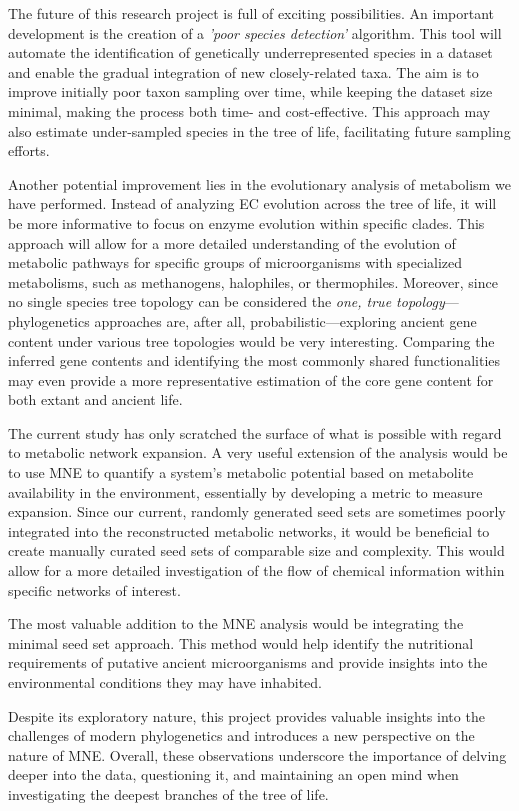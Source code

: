 The future of this research project is full of exciting possibilities. An important development is the creation of a \textit{'poor species detection'} algorithm. This tool will automate the identification of genetically underrepresented species in a dataset and enable the gradual integration of new closely-related taxa. The aim is to improve initially poor taxon sampling over time, while keeping the dataset size minimal, making the process both time- and cost-effective. This approach may also estimate under-sampled species in the tree of life, facilitating future sampling efforts.

Another potential improvement lies in the evolutionary analysis of metabolism we have performed. Instead of analyzing EC evolution across the tree of life, it will be more informative to focus on enzyme evolution within specific clades. This approach will allow for a more detailed understanding of the evolution of metabolic pathways for specific groups of microorganisms with specialized metabolisms, such as methanogens, halophiles, or thermophiles. Moreover, since no single species tree topology can be considered the \textit{one, true topology}---phylogenetics approaches are, after all, probabilistic---exploring ancient gene content under various tree topologies would be very interesting. Comparing the inferred gene contents and identifying the most commonly shared functionalities may even provide a more representative estimation of the core gene content for both extant and ancient life.

The current study has only scratched the surface of what is possible with regard to metabolic network expansion. A very useful extension of the analysis would be to use MNE to quantify a system's metabolic potential based on metabolite availability in the environment, essentially by developing a metric to measure expansion. Since our current, randomly generated seed sets are sometimes poorly integrated into the reconstructed metabolic networks, it would be beneficial to create manually curated seed sets of comparable size and complexity. This would allow for a more detailed investigation of the flow of chemical information within specific networks of interest. 

The most valuable addition to the MNE analysis would be integrating the minimal seed set approach. This method would help identify the nutritional requirements of putative ancient microorganisms and provide insights into the environmental conditions they may have inhabited.

Despite its exploratory nature, this project provides valuable insights into the challenges of modern phylogenetics and introduces a new perspective on the nature of MNE. Overall, these observations underscore the importance of delving deeper into the data, questioning it, and maintaining an open mind when investigating the deepest branches of the tree of life.